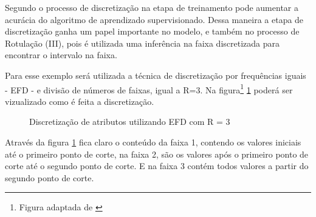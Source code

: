 Segundo \cite{Catlett2006, Hwang2002} o processo de discretização na etapa de treinamento pode aumentar a acurácia do algoritmo de aprendizado supervisionado. Dessa maneira a etapa de discretização ganha um papel importante no modelo, e também no processo de Rotulação (III), pois é utilizada uma inferência na faixa discretizada para encontrar o intervalo na faixa.

Para esse exemplo será utilizada a técnica de discretização por frequências iguais - EFD - e divisão de números de faixas, igual a R=3. Na figura\footnote{Figura adaptada de \cite{Lopes}} \ref{fig:EFD_R_3} poderá ser vizualizado como é feita a discretização.
 \begin{figure}[h!]
    \centering
    
    
    
    \caption{Discretização de atributos utilizando EFD com R = 3} \label{fig:EFD_R_3}
        
\end{figure}
Através da figura \ref{fig:EFD_R_3} fica claro o conteúdo da faixa 1, contendo os valores iniciais até o primeiro ponto de corte, na faixa 2, são os valores após o primeiro ponto de corte até o segundo ponto de corte. E na faixa 3 contém todos  valores a partir do segundo ponto de corte.


